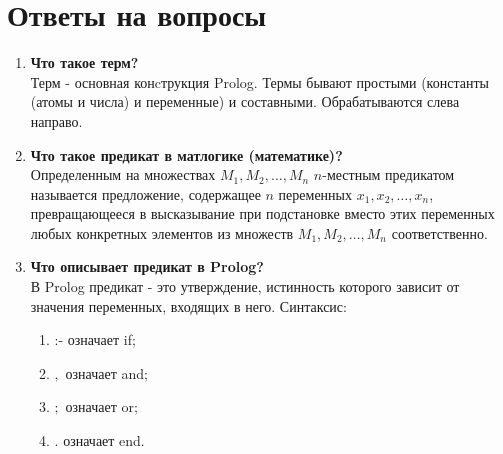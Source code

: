 \newpage
\section*{Ответы на вопросы}
\begin{enumerate}
    \item \textbf{Что такое терм?}\\
    Терм - основная конcтрукция Prolog. Термы бывают простыми (константы (атомы и числа) и переменные) и составными. Обрабатываются слева направо.
    
    \item \textbf{Что такое предикат в матлогике (математике)?}\\
    Определенным на множествах $M_1,M_2,\ldots,M_n$ $n$-местным предикатом называется предложение, содержащее $n$ переменных $x_1,x_2,\ldots,x_n$, превращающееся в высказывание при подстановке вместо этих переменных любых конкретных элементов из множеств $M_1,M_2,\ldots,M_n$ соответственно.
    
    \item \textbf{Что описывает предикат в Prolog?}\\
    В Prolog предикат - это утверждение, истинность которого зависит от значения переменных, входящих в него. Синтаксис:
    \begin{enumerate}
    	\item :- означает if;
    	\item $,$ означает and;
    	\item $;$ означает or;
    	\item $.$ означает end.
	\end{enumerate}


\end{enumerate}
